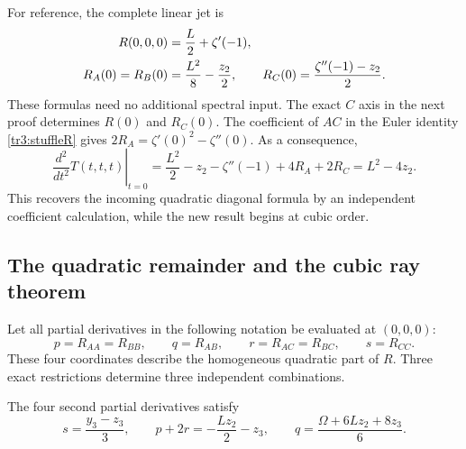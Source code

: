 For reference, the complete linear jet is
\begin{align}\label{tr3:linearjet}
 R(0,0,0)&=\frac L2+\zeta'(-1),\notag\\
 R_A(0)=R_B(0)&=\frac{L^2}{8}-\frac{z_2}{2},\qquad
 R_C(0)=\frac{\zeta''(-1)-z_2}{2}.
\end{align}
These formulas need no additional spectral input.  The exact $C$ axis
in the next proof determines $R(0)$ and $R_C(0)$.  The coefficient of
$AC$ in the Euler identity \eqref{tr3:stuffleR} gives
$2R_A=\zeta'(0)^2-\zeta''(0)$.  As a consequence,
\[
 \left.\frac{d^2}{dt^2}T(t,t,t)\right|_{t=0}
  =\frac{L^2}{2}-z_2-\zeta''(-1)+4R_A+2R_C
  =L^2-4z_2.
\]
This recovers the incoming quadratic diagonal formula by an independent
coefficient calculation, while the new result begins at cubic order.

\subsection{The quadratic remainder and the cubic ray theorem}

Let all partial derivatives in the following notation be evaluated
at $(0,0,0)$:
\[
 p=R_{AA}=R_{BB},\qquad q=R_{AB},\qquad
 r=R_{AC}=R_{BC},\qquad s=R_{CC}.
\]
These four coordinates describe the homogeneous quadratic part of
$R$.  Three exact restrictions determine three independent combinations.

\begin{lemma}\label{tr3:constraints}
The four second partial derivatives satisfy
\begin{equation}\label{tr3:quadraticjet}
 \boxed{\displaystyle
 s=\frac{y_3-z_3}{3},\qquad
 p+2r=-\frac{Lz_2}{2}-z_3,\qquad
 q=\frac{\Omega+6Lz_2+8z_3}{6}.}
\end{equation}
\end{lemma}

